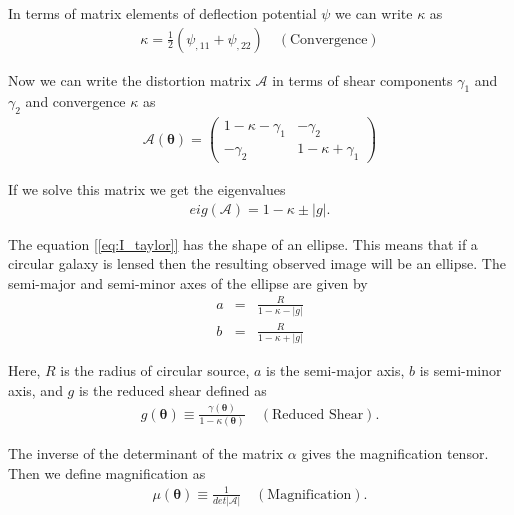   In terms of matrix elements of deflection potential $\psi$ we can write $\kappa$ as
  \begin{eqnarray}\label{[eq:kappa_psi]}
    \boxed{\kappa = \frac{1}{2} (\psi_{,11} + \psi_{,22})} \quad (\text{Convergence})
  \end{eqnarray}

  Now we can write the distortion matrix $\mathscr{A}$ in terms of
  shear components $\gamma_1$ and $\gamma_2$ and convergence $\kappa$ as
  \begin{eqnarray}\label{[eq:A_theta]}
    \mathscr{A}(\boldsymbol{\theta}) =
    \begin{pmatrix}
      1 - \kappa - \gamma_1 & - \gamma_2  \\
      - \gamma_2 & 1 - \kappa + \gamma_1
    \end{pmatrix}
  \end{eqnarray}

  If we solve this matrix we get the eigenvalues
  \begin{eqnarray}\label{[eq:eigen]}
    eig(\mathscr{A}) = 1 - \kappa \pm \lvert g \rvert .
  \end{eqnarray}

  The equation \ref{[eq:I_taylor]} has the shape of an ellipse. This means that
  if a circular galaxy is lensed then the resulting observed image will be an
  ellipse. The semi-major and semi-minor axes of the ellipse are given by
  \begin{eqnarray}\label{[eq:semi_axes]}
    a &=& \frac{R}{1 - \kappa  - \lvert g \rvert } \\
    b &=& \frac{R}{1 - \kappa  + \lvert g \rvert }
  \end{eqnarray}

  Here, $R$ is the radius of circular source, $a$ is the semi-major axis, $b$ is semi-minor axis, and $g$ is the reduced shear
  defined as
  \begin{eqnarray}\label{[eq:g]}
    \boxed{g(\boldsymbol{\theta} ) \equiv \frac{\gamma(\boldsymbol{\theta} )}{1 - \kappa(\boldsymbol{\theta} )}} \quad (\text{Reduced Shear}).
  \end{eqnarray}

  The inverse of the determinant of the matrix $\mathscr{\alpha}$ gives the
  magnification tensor. Then we define magnification as
  \begin{eqnarray}\label{[eq:magnification]}
    \boxed{\mu(\boldsymbol{\theta}) \equiv \frac{1}{det \lvert \mathscr{A} \rvert }} \quad (\text{Magnification}).
  \end{eqnarray}